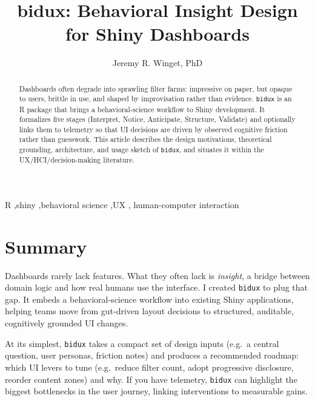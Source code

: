 \documentclass[
  authoryear,
  preprint]{elsarticle}
\begin{document}
\begin{frontmatter}
\title{bidux: Behavioral Insight Design for Shiny Dashboards}
\author[1]{Jeremy R. Winget, PhD%
%
}



        
\begin{abstract}
Dashboards often degrade into sprawling filter farms: impressive on
paper, but opaque to users, brittle in use, and shaped by improvisation
rather than evidence. \texttt{bidux} is an R package that brings a
behavioral-science workflow to Shiny development. It formalizes five
stages (Interpret, Notice, Anticipate, Structure, Validate) and
optionally links them to telemetry so that UI decisions are driven by
observed cognitive friction rather than guesswork. This article
describes the design motivations, theoretical grounding, architecture,
and usage sketch of \texttt{bidux}, and situates it within the
UX/HCI/decision-making literature.
\end{abstract}





\begin{keyword}
    R \sep shiny \sep behavioral science \sep UX \sep 
    human-computer interaction
\end{keyword}
\end{frontmatter}
    

\section{Summary}\label{summary}

Dashboards rarely lack features. What they often lack is \emph{insight},
a bridge between domain logic and how real humans use the interface. I
created \texttt{bidux} to plug that gap. It embeds a behavioral-science
workflow into existing Shiny applications, helping teams move from
gut-driven layout decisions to structured, auditable, cognitively
grounded UI changes.

At its simplest, \texttt{bidux} takes a compact set of design inputs
(e.g.~a central question, user personas, friction notes) and produces a
recommended roadmap: which UI levers to tune (e.g.~reduce filter count,
adopt progressive disclosure, reorder content zones) and why. If you
have telemetry, \texttt{bidux} can highlight the biggest bottlenecks in
the user journey, linking interventions to measurable gains.
\end{document}
